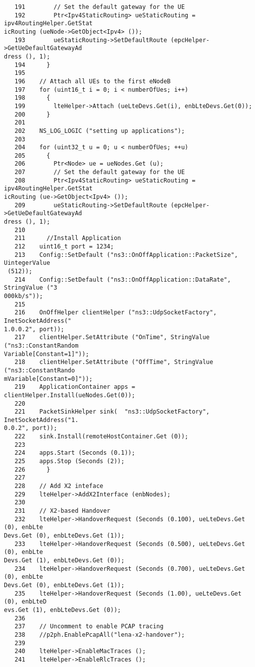 \begin{verbatim}
   191        // Set the default gateway for the UE
   192        Ptr<Ipv4StaticRouting> ueStaticRouting = ipv4RoutingHelper.GetStat
icRouting (ueNode->GetObject<Ipv4> ());
   193        ueStaticRouting->SetDefaultRoute (epcHelper->GetUeDefaultGatewayAd
dress (), 1);
   194      }
   195
   196    // Attach all UEs to the first eNodeB
   197    for (uint16_t i = 0; i < numberOfUes; i++)
   198      {
   199        lteHelper->Attach (ueLteDevs.Get(i), enbLteDevs.Get(0));
   200      }
   201
   202    NS_LOG_LOGIC ("setting up applications");
   203      
   204    for (uint32_t u = 0; u < numberOfUes; ++u)
   205      {
   206        Ptr<Node> ue = ueNodes.Get (u);
   207        // Set the default gateway for the UE
   208        Ptr<Ipv4StaticRouting> ueStaticRouting = ipv4RoutingHelper.GetStat
icRouting (ue->GetObject<Ipv4> ());
   209        ueStaticRouting->SetDefaultRoute (epcHelper->GetUeDefaultGatewayAd
dress (), 1);
   210
   211      //Install Application
   212    uint16_t port = 1234;      
   213    Config::SetDefault ("ns3::OnOffApplication::PacketSize", UintegerValue
 (512));
   214    Config::SetDefault ("ns3::OnOffApplication::DataRate", StringValue ("3
000kb/s"));
   215    
   216    OnOffHelper clientHelper ("ns3::UdpSocketFactory", InetSocketAddress("
1.0.0.2", port));
   217    clientHelper.SetAttribute ("OnTime", StringValue ("ns3::ConstantRandom
Variable[Constant=1]"));
   218    clientHelper.SetAttribute ("OffTime", StringValue ("ns3::ConstantRando
mVariable[Constant=0]"));
   219    ApplicationContainer apps = clientHelper.Install(ueNodes.Get(0));
   220
   221    PacketSinkHelper sink(  "ns3::UdpSocketFactory", InetSocketAddress("1.
0.0.2", port));
   222    sink.Install(remoteHostContainer.Get (0));
   223
   224    apps.Start (Seconds (0.1));
   225    apps.Stop (Seconds (2));
   226      }
   227
   228    // Add X2 inteface
   229    lteHelper->AddX2Interface (enbNodes);
   230
   231    // X2-based Handover
   232    lteHelper->HandoverRequest (Seconds (0.100), ueLteDevs.Get (0), enbLte
Devs.Get (0), enbLteDevs.Get (1));
   233    lteHelper->HandoverRequest (Seconds (0.500), ueLteDevs.Get (0), enbLte
Devs.Get (1), enbLteDevs.Get (0));
   234    lteHelper->HandoverRequest (Seconds (0.700), ueLteDevs.Get (0), enbLte
Devs.Get (0), enbLteDevs.Get (1));
   235    lteHelper->HandoverRequest (Seconds (1.00), ueLteDevs.Get (0), enbLteD
evs.Get (1), enbLteDevs.Get (0));
   236    
   237    // Uncomment to enable PCAP tracing
   238    //p2ph.EnablePcapAll("lena-x2-handover");
   239
   240    lteHelper->EnableMacTraces ();
   241    lteHelper->EnableRlcTraces ();

\end{verbatim}
